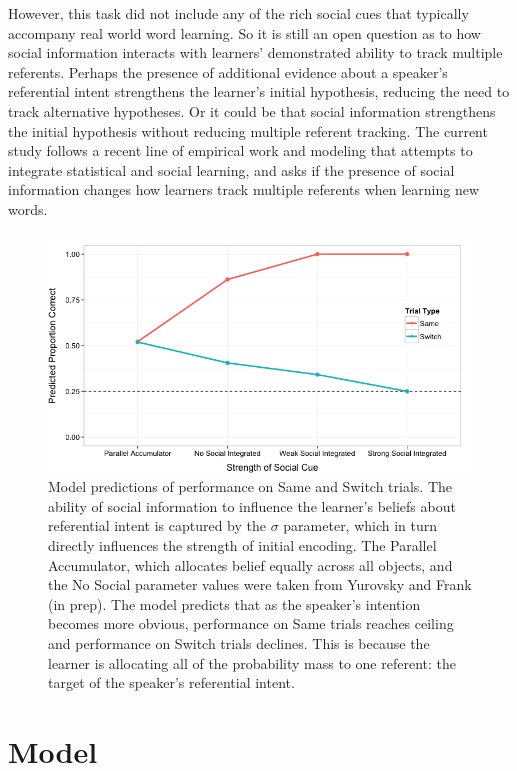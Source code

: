 \documentclass[10pt,letterpaper]{article}
\begin{document}
However, this task did not include any of the rich social cues that typically accompany real world word learning. So it is still an open question as to how social information interacts with learners' demonstrated ability to track multiple referents. Perhaps the presence of additional evidence about a speaker's referential intent strengthens the learner's initial hypothesis, reducing the need to track alternative hypotheses. Or it could be that social information strengthens the initial hypothesis without reducing multiple referent tracking. The current study follows a recent line of empirical work and modeling that attempts to integrate statistical and social learning\cite{johnson2012exploiting,frank2009using,yu2007unified}, and asks if the presence of social information changes how learners track multiple referents when learning new words.

\begin{figure}
	\centering
	\includegraphics[scale=0.5]{model_predictions.png}
	\caption{Model predictions of performance on Same and Switch trials. The ability of social information to influence the learner's beliefs about referential intent is captured by the $\sigma$ parameter, which in turn directly influences the strength of initial encoding. The Parallel Accumulator, which allocates belief equally across all objects, and the No Social parameter values were taken from Yurovsky and Frank (in prep). The model predicts that as the speaker's intention becomes more obvious, performance on Same trials reaches ceiling and performance on Switch trials declines. This is because the learner is allocating all of the probability mass to one referent: the target of the speaker's referential intent.}
\end{figure}

\section{Model}
\end{document}
